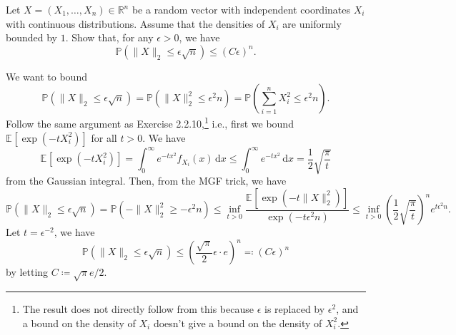 \begin{problem*}[Exercise 3.1.7]\label{ex3.1.7}
	Let \(X = (X_1, \dots , X_n) \in \mathbb{R} ^n\) be a random vector with independent coordinates \(X_i\) with continuous distributions. Assume that the densities of \(X_i\) are uniformly bounded by \(1\). Show that, for any \(\epsilon > 0\), we have
	\[
		\mathbb{P} (\lVert X \rVert _2 \leq \epsilon \sqrt{n} )
		\leq (C \epsilon )^n.
	\]
\end{problem*}
\begin{answer}
	We want to bound
	\[
		\mathbb{P} \left( \lVert X \rVert _2 \leq \epsilon \sqrt{n} \right)
		= \mathbb{P} (\lVert X \rVert _2^2 \leq \epsilon ^2 n)
		= \mathbb{P} \left( \sum_{i=1}^{n} X_i^2 \leq \epsilon ^2 n \right).
	\]
	Follow the same argument as Exercise 2.2.10,\footnote{The result does not directly follow from this because \(\epsilon \) is replaced by \(\epsilon ^2\), and a bound on the density of \(X_i\) doesn't give a bound on the density of \(X_i^2\).} i.e., first we bound \(\mathbb{E}_{}[\exp (-t X_i^2)] \) for all \(t > 0\). We have
	\[
		\mathbb{E}_{}[\exp (-t X_i^2)]
		= \int_{0}^{\infty} e^{-t x^2} f_{X_i}(x) \,\mathrm{d}x
		\leq \int_{0}^{\infty} e^{-t x^2} \,\mathrm{d}x
		= \frac{1}{2}\sqrt{\frac{\pi }{t}}
	\]
	from the Gaussian integral. Then, from the MGF trick, we have
	\[
		\mathbb{P} (\lVert X \rVert _2 \leq \epsilon \sqrt{n} )
		= \mathbb{P} (- \lVert X \rVert _2^2 \geq - \epsilon ^2 n)
		\leq \inf _{t > 0} \frac{\mathbb{E}_{}[\exp (-t \lVert X \rVert _2^2)] }{\exp (-t \epsilon ^2 n)}
		\leq \inf _{t > 0} \left( \frac{1}{2} \sqrt{\frac{\pi }{t}} \right) ^n e^{t \epsilon ^2 n}.
	\]
	Let \(t = \epsilon ^{-2}\), we have
	\[
		\mathbb{P} (\lVert X \rVert _2 \leq \epsilon \sqrt{n} )
		\leq \left( \frac{\sqrt{\pi } }{2} \epsilon \cdot e \right) ^n
		\eqqcolon (C \epsilon )^n
	\]
	by letting \(C \coloneqq \sqrt{\pi }e / 2 \).
\end{answer}

